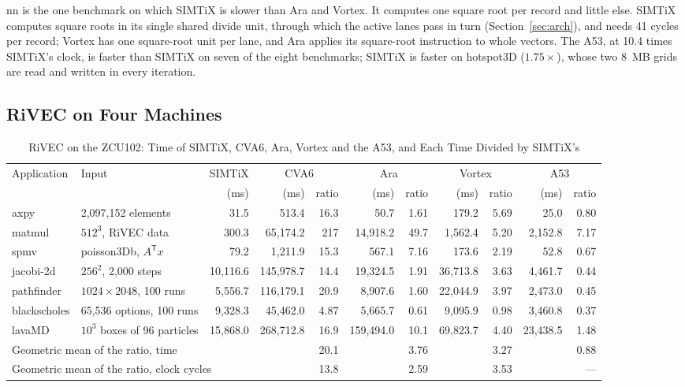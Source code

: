 \documentclass[journal]{IEEEtran}
\begin{document}
nn is the one benchmark on which SIMTiX is slower than Ara and Vortex. It computes one
square root per record and little else. SIMTiX computes square roots in its single
shared divide unit, through which the active lanes pass in turn
(Section~\ref{sec:arch}), and needs 41 cycles per record; Vortex has one square-root
unit per lane, and Ara applies its square-root instruction to whole vectors. The A53,
at 10.4 times SIMTiX's clock, is faster than SIMTiX on seven of the eight benchmarks;
SIMTiX is faster on hotspot3D ($1.75\times$), whose two 8~MB grids are read and
written in every iteration.

\subsection{RiVEC on Four Machines}\label{sec:rivec}
\begin{table}[t]
\caption{RiVEC on the ZCU102: Time of SIMTiX, CVA6, Ara, Vortex and the A53, and Each
Time Divided by SIMTiX's}
\label{tab:rivec}
\centering\footnotesize
\setlength{\tabcolsep}{3.2pt}
\begin{tabular}{llrrrrrrrrr}
\toprule
Application & Input & SIMTiX & \multicolumn{2}{c}{CVA6} & \multicolumn{2}{c}{Ara}
 & \multicolumn{2}{c}{Vortex} & \multicolumn{2}{c}{A53}\\
\cmidrule(lr){4-5}\cmidrule(lr){6-7}\cmidrule(lr){8-9}\cmidrule(lr){10-11}
 & & (ms) & (ms) & ratio & (ms) & ratio & (ms) & ratio & (ms) & ratio\\
\midrule
axpy         & 2,097,152 elements             & 31.5 & 513.4 & 16.3 & 50.7 & 1.61 & 179.2 & 5.69 & 25.0 & 0.80 \\
matmul       & $512^3$, RiVEC data            & 300.3 & 65,174.2 & 217 & 14,918.2 & 49.7 & 1,562.4 & 5.20 & 2,152.8 & 7.17 \\
spmv         & poisson3Db, $A^{\mathsf T}x$   & 79.2 & 1,211.9 & 15.3 & 567.1 & 7.16 & 173.6 & 2.19 & 52.8 & 0.67 \\
jacobi-2d    & $256^2$, 2,000 steps           & 10,116.6 & 145,978.7 & 14.4 & 19,324.5 & 1.91 & 36,713.8 & 3.63 & 4,461.7 & 0.44 \\
pathfinder   & $1024\times2048$, 100 runs     & 5,556.7 & 116,179.1 & 20.9 & 8,907.6 & 1.60 & 22,044.9 & 3.97 & 2,473.0 & 0.45 \\
blackscholes & 65,536 options, 100 runs       & 9,328.3 & 45,462.0 & 4.87 & 5,665.7 & 0.61 & 9,095.9 & 0.98 & 3,460.8 & 0.37 \\
lavaMD       & $10^3$ boxes of 96 particles   & 15,868.0 & 268,712.8 & 16.9 & 159,494.0 & 10.1 & 69,823.7 & 4.40 & 23,438.5 & 1.48 \\
\midrule
\multicolumn{3}{l}{Geometric mean of the ratio, time} & & 20.1 & & 3.76 & & 3.27 & & 0.88\\
\multicolumn{3}{l}{Geometric mean of the ratio, clock cycles} & & 13.8 & & 2.59 & & 3.53 & & ---\\
\bottomrule
\end{tabular}


\end{table}
\end{document}
